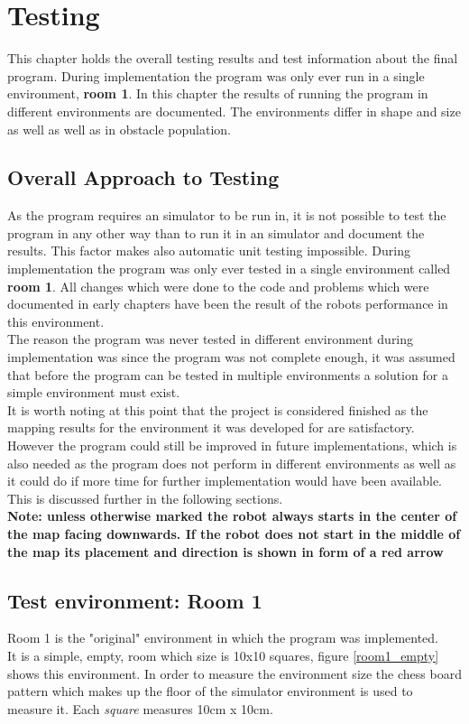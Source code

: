 \chapter{Testing}
\label{Testing}
This chapter holds the overall testing results and test information about the final program.
During implementation the program was only ever run in a single environment, \textbf{room 1}.
In this chapter the results of running the program in different environments are documented. The environments differ in shape and size as well as well as in obstacle population.

\section{Overall Approach to Testing}
As the program requires an simulator to be run in, it is not possible to test the program in any other way than to run it in an simulator and document the results. This factor makes also automatic unit testing impossible. During implementation the program was only ever tested in a single environment called \textbf{room 1}. All changes which were done to the code and problems which were documented in early chapters have been the result of the robots performance in this environment. \\[3ex]

The reason the program was never tested in different environment during implementation was since the program was not complete enough, it was assumed that before the program can be tested in multiple environments a solution for a simple environment must exist.\\
It is worth noting at this point that the project is considered finished as the mapping results for the environment it was developed for are satisfactory. However the program could still be improved in future implementations, which is also needed as the program does not perform in different environments as well as it could do if more time for further implementation would have been available. 
This is discussed further in the following sections.\\
\textbf{Note: unless otherwise marked the robot always starts in the center of the map facing downwards. If the robot does not start in the middle of the map its placement and direction is shown in form of a red arrow}

\section{Test environment: Room 1}
\label{room1}
Room 1 is the "original" environment in which the program was implemented. \\
It is a simple, empty, room which size is 10x10 squares, figure \ref{room1_empty} shows this environment. In order to measure the environment size the chess board pattern which makes up the floor of the simulator environment is used to measure it. Each \textit{square} measures 10cm x 10cm.

